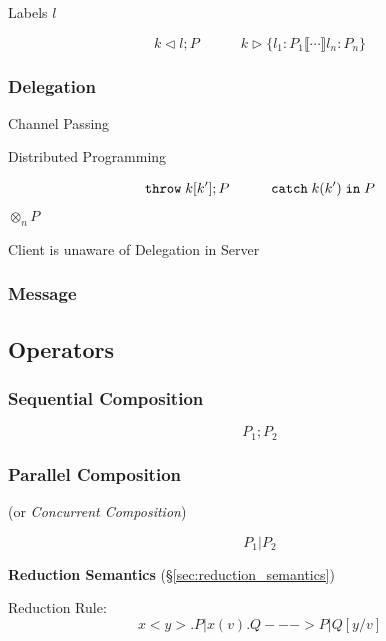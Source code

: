 Labels $l$

\[
  k \lhd l; P
  \quad\quad\quad
  k \rhd \{ l_1 : P_1 \llbracket \cdots \rrbracket l_n : P_n \}
\]



\subsubsection{Delegation}\label{sec:delegation}

Channel Passing

Distributed Programming

\[
  \mathtt{throw} \; k[k']; P
  \quad\quad\quad
  \mathtt{catch} \; k(k') \; \mathtt{in} \; P
\]

$\otimes_n P$

Client is unaware of Delegation in Server



\subsubsection{Message}\label{sec:message}



\subsection{Operators}\label{sec:process_operators}

\subsubsection{Sequential Composition}\label{sec:sequential_composition}

\[
  P_1; P_2
\]



\subsubsection{Parallel Composition}\label{sec:parallel_composition}

(or \emph{Concurrent Composition})

\[
  P_1 | P_2
\]


\textbf{Reduction Semantics} (\S\ref{sec:reduction_semantics})

Reduction Rule:
\[
  x<y>.P | x(v).Q ---> P | Q[y/v]
\]




